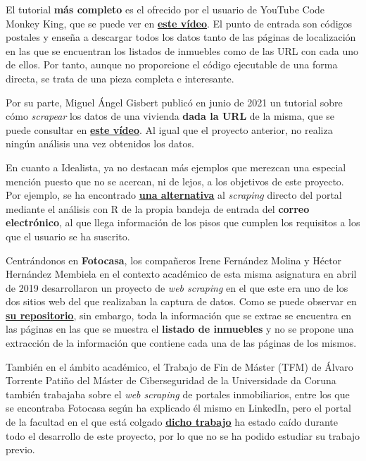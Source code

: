 \documentclass[12pt]{article}
\begin{document}
El tutorial\textbf{ más completo} es el ofrecido por el usuario de YouTube Code Monkey King, que se puede ver en \href{https://www.youtube.com/watch?v=4Tv73KuqgVo}{\textbf{\underline{este vídeo}}}. El punto de entrada son códigos postales y enseña a descargar todos los datos tanto de las páginas de localización en las que se encuentran los listados de inmuebles como de las URL con cada uno de ellos. Por tanto, aunque no proporcione el código ejecutable de una forma directa, se trata de una pieza completa e interesante. 

Por su parte, Miguel Ángel Gisbert publicó en junio de 2021 un tutorial sobre cómo \textit{scrapear} los datos de una vivienda \textbf{dada la URL} de la misma, que se puede consultar en \href{https://www.youtube.com/watch?v=2UyJv5oe570}{\textbf{\underline{este vídeo}}}. Al igual que el proyecto anterior, no realiza ningún análisis una vez obtenidos los datos. 

En cuanto a Idealista, ya no destacan más ejemplos que merezcan una especial mención puesto que no se acercan, ni de lejos, a los objetivos de este proyecto. Por ejemplo, se ha encontrado \href{https://medium.com/@rubenmarcos/crear-una-base-de-datos-de-la-evoluci%C3%B3n-del-mercado-inmobiliario-con-idealista-y-r-y-sin-scraping-1d5025a9d47e}{\textbf{\underline{una alternativa}}} al \textit{scraping} directo del portal mediante el análisis con R de la propia bandeja de entrada del\textbf{ correo electrónico}, al que llega información de los pisos que cumplen los requisitos a los que el usuario se ha suscrito.

Centrándonos en \textbf{Fotocasa}, los compañeros Irene Fernández Molina y Héctor Hernández Membiela en el contexto académico de esta misma asignatura en abril de 2019 desarrollaron un proyecto de \textit{web scraping} en el que este era uno de los dos sitios web del que realizaban la captura de datos. Como se puede observar en \href{https://github.com/EdelBlau/PEC_TPC}{\textbf{\underline{su repositorio}}}, sin embargo, toda la información que se extrae se encuentra en las páginas en las que se muestra el\textbf{ listado de inmuebles }y no se propone una extracción de la información que contiene cada una de las páginas de los mismos. 

También en el ámbito académico, el Trabajo de Fin de Máster (TFM) de Álvaro Torrente Patiño del Máster de Ciberseguridad de la Universidade da Coruna también trabajaba sobre el \textit{web scraping} de portales inmobiliarios, entre los que se encontraba Fotocasa según ha explicado él mismo en LinkedIn, pero el portal de la facultad en el que está colgado \href{http://castor.det.uvigo.es:8080/xmlui/bitstream/handle/123456789/575/TorrentePatino_Alvaro_TFM_2021.pdf?sequence=1&isAllowed=y}{\textbf{\underline{dicho trabajo}}} ha estado caído durante todo el desarrollo de este proyecto, por lo que no se ha podido estudiar su trabajo previo.  
\end{document}
